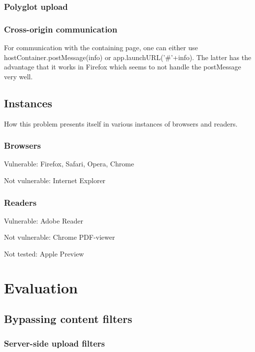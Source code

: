 \documentclass[10pt, conference, compsocconf]{IEEEtran}
\begin{document}
\subsubsection{Polyglot upload}



\subsubsection{Cross-origin communication}

For communication with the containing page, one can either use 
hostContainer.postMessage(info) or app.launchURL('\#'+info). The 
latter has the advantage that it works in Firefox which seems 
to not handle the postMessage very well.


\subsection{Instances}

How this problem presents itself in various instances of browsers and readers.


\subsubsection{Browsers}

Vulnerable: Firefox, Safari, Opera, Chrome

Not vulnerable: Internet Explorer


\subsubsection{Readers}

Vulnerable: Adobe Reader

Not vulnerable: Chrome PDF-viewer

Not tested: Apple Preview










\section{Evaluation}


\subsection{Bypassing content filters}


\subsubsection{Server-side upload filters}
\end{document}

